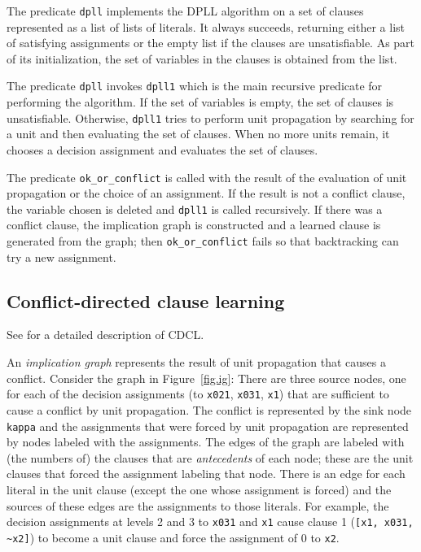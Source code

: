 \documentclass[11pt]{article}
\newcommand*{\p}[1]{\textup{\texttt{#1}}}
\begin{document}
The predicate \p{dpll} implements the DPLL algorithm on a set of clauses
represented as a list of lists of literals. It always succeeds,
returning either a list of satisfying assignments or the empty list if
the clauses are unsatisfiable. As part of its initialization, the set of
variables in the clauses is obtained from the list. 

The predicate \p{dpll} invokes \p{dpll1} which is the main recursive
predicate for performing the algorithm. If the set of variables is
empty, the set of clauses is unsatisfiable. Otherwise, \p{dpll1} tries
to perform unit propagation by searching for a unit and then evaluating
the set of clauses. When no more units remain, it chooses a decision
assignment and evaluates the set of clauses.

The predicate \p{ok\_or\_conflict} is called with the result of the
evaluation of unit propagation or the choice of an assignment. If the
result is not a conflict clause, the variable chosen is deleted and
\p{dpll1} is called recursively. If there was a conflict clause, the
implication graph is constructed and a learned clause is generated from
the graph; then \p{ok\_or\_conflict} fails so that backtracking can try
a new assignment.

\subsection{Conflict-directed clause learning}

See \cite{mlm} for a detailed description of CDCL.

An \emph{implication graph} represents the result of unit propagation
that causes a conflict. Consider the graph in Figure~\ref{fig.ig}: There
are three source nodes, one for each of the decision assignments (to
\p{x021}, \p{x031}, \p{x1}) that are sufficient to cause a conflict by
unit propagation. The conflict is represented by the sink node \p{kappa}
and the assignments that were forced by unit propagation are represented
by nodes labeled with the assignments. The edges of the graph are
labeled with (the numbers of) the clauses that are \emph{antecedents} of
each node; these are the unit clauses that forced the assignment
labeling that node. There is an edge for each literal in the unit clause
(except the one whose assignment is forced) and the sources of these
edges are the assignments to those literals. For example, the decision
assignments at levels 2 and 3 to \p{x031} and \p{x1} cause clause 1
(\verb+[x1, x031, ~x2]+) to become a unit clause and force the
assignment of 0 to \p{x2}.
\end{document}

